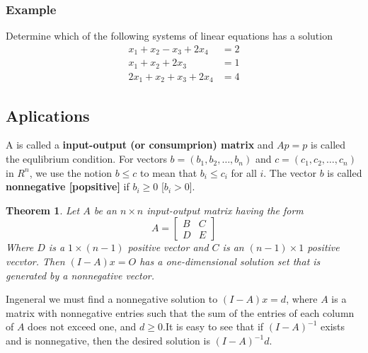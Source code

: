 \documentclass[10pt, oneside]{article}
\newtheorem{thm}{Theorem}
\begin{document}
\subsubsection{Example}
Determine which of the following systems of linear equations has a solution
\[
	\begin{array}{ll}
		x_1 + x_2 - x_3 + 2x_4  & = 2 \\
		x_1 + x_2 + 2x_3 \quad  & = 1 \\
		2x_1 + x_2 + x_3 + 2x_4 & = 4
	\end{array}
\]

\subsection{Aplications}
A is called a \textbf{input-output (or consumprion) matrix} and $Ap = p$ is called the equlibrium condition. For vectors $b = (b_1, b_2, \ldots, b_n)$ and $c = (c_1, c_2, \ldots, c_n)$ in $R^n$, we
use the notion $b \leq c$ to mean that $b_i \leq c_i$ for all $i$. The vector $b$ is called \textbf{nonnegative [popsitive]} if $b_i \geq 0$ [$b_i > 0$].

\begin{thm}
	Let $A$ be an $n \times n$ input-output matrix having the form
	\[
		A = \begin{bmatrix}
			B & C \\
			D & E
		\end{bmatrix}
	\]
	Where  $D$ is a $1 \times (n - 1)$ positive vector and $C$ is an $(n - 1) \times 1$ positive vecvtor. Then $(I - A)x = O$ has a one-dimensional solution set that is generated by a nonnegative vector.
\end{thm}

Ingeneral we must find a nonnegative solution to $(I - A)x = d$, where $A$ is a matrix with nonnegative entries such that the sum of the entries of each column of $A$ does not exceed one, and $d \geq 0$.It is easy to
see that if $(I - A)^{-1}$ exists and is nonnegative, then the desired solution is $(I - A)^{-1}d$.
\end{document}
